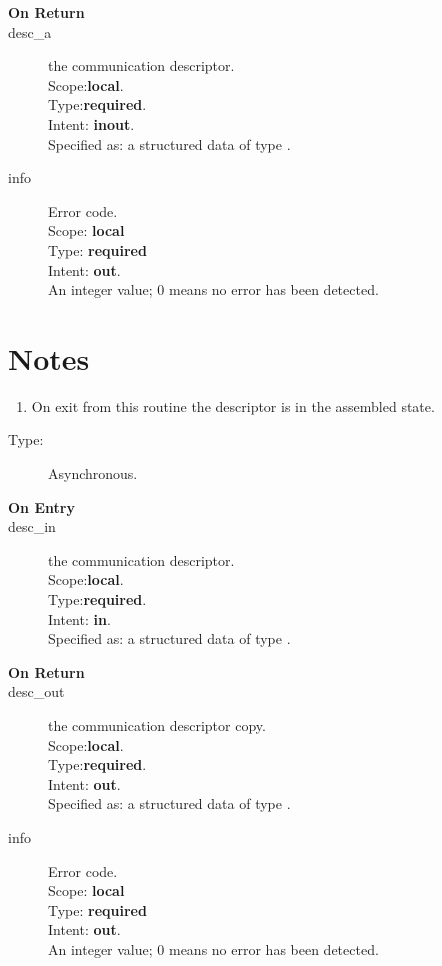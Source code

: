 \begin{description}
\item[\bf On Return]
\item[desc\_a] the communication descriptor.\\
Scope:{\bf local}.\\
Type:{\bf required}.\\
Intent: {\bf inout}.\\
Specified as: a structured data of type \descdata.
\item[info] Error code.\\
Scope: {\bf local} \\
Type: {\bf required} \\
Intent: {\bf out}.\\
An integer value; 0 means no error has been detected. 
\end{description}
\section*{Notes}
\begin{enumerate}
\item On exit from this routine the descriptor is in the assembled
  state. 
\end{enumerate}



%
%


\begin{description}
\item[Type:] Asynchronous.
\item[\bf On Entry]
\item[desc\_in] the communication descriptor.\\
Scope:{\bf local}.\\
Type:{\bf required}.\\
Intent: {\bf in}.\\
Specified as: a structured data of type \descdata.

\end{description}

\begin{description}
\item[\bf On Return]
\item[desc\_out] the communication descriptor copy.\\
Scope:{\bf local}.\\
Type:{\bf required}.\\
Intent: {\bf out}.\\
Specified as: a structured data of type \descdata.
\item[info] Error code.\\
Scope: {\bf local} \\
Type: {\bf required} \\
Intent: {\bf out}.\\
An integer value; 0 means no error has been detected. 
\end{description}


